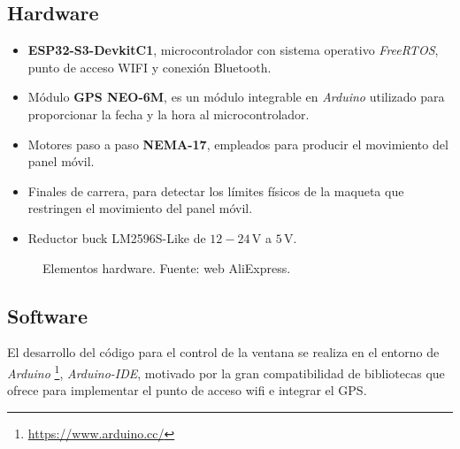\subsection{Hardware}
\begin{itemize}
	\item \textbf{ESP32-S3-DevkitC1}, microcontrolador con sistema operativo \textit{FreeRTOS}, punto de acceso WIFI y conexión Bluetooth.
	\item Módulo \textbf {GPS NEO-6M}, es un módulo integrable en \textit{Arduino} utilizado para proporcionar la fecha y la hora al microcontrolador.
	\item Motores paso a paso \textbf{NEMA-17}, empleados para producir el movimiento del panel móvil.
	\item Finales de carrera, para detectar los límites físicos de la maqueta que restringen el movimiento del panel móvil.
	\item Reductor buck LM2596S-Like de $12-24\, \mathrm{V}$ a $5\, \mathrm{V}$.
\end{itemize}

\begin{figure}[t]
	\centering
	
	\subfloat[Nema-17 42x42x38]{
				
	}
	\subfloat[Nema-17 42x42x48mm]{
				
	}
	
	\caption{Elementos hardware. Fuente: web AliExpress.}
\end{figure}

\subsection{Software}

El desarrollo del código para el control de la ventana se realiza en el entorno de \textit{Arduino} \footnote{\url{https://www.arduino.cc/}}, \textit{Arduino-IDE}, motivado por la gran compatibilidad de bibliotecas que ofrece para implementar el punto de acceso wifi e integrar el GPS.
